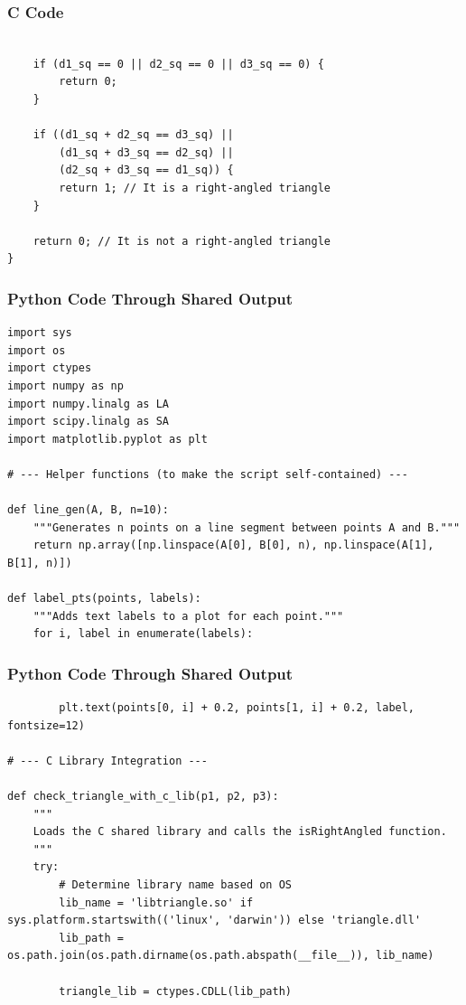 \documentclass{beamer}
\begin{document}
\begin{frame}[fragile]
\frametitle{C Code }
\begin{lstlisting}

    if (d1_sq == 0 || d2_sq == 0 || d3_sq == 0) {
        return 0;
    }

    if ((d1_sq + d2_sq == d3_sq) ||
        (d1_sq + d3_sq == d2_sq) ||
        (d2_sq + d3_sq == d1_sq)) {
        return 1; // It is a right-angled triangle
    }

    return 0; // It is not a right-angled triangle
}

\end{lstlisting}
\end{frame}  

\begin{frame}[fragile]
\frametitle{Python Code Through Shared Output}
\begin{lstlisting}
import sys
import os
import ctypes
import numpy as np
import numpy.linalg as LA
import scipy.linalg as SA
import matplotlib.pyplot as plt

# --- Helper functions (to make the script self-contained) ---

def line_gen(A, B, n=10):
    """Generates n points on a line segment between points A and B."""
    return np.array([np.linspace(A[0], B[0], n), np.linspace(A[1], B[1], n)])

def label_pts(points, labels):
    """Adds text labels to a plot for each point."""
    for i, label in enumerate(labels):
    \end{lstlisting}
\end{frame}  

\begin{frame}[fragile]
\frametitle{Python Code Through Shared Output}
\begin{lstlisting}
        plt.text(points[0, i] + 0.2, points[1, i] + 0.2, label, fontsize=12)

# --- C Library Integration ---

def check_triangle_with_c_lib(p1, p2, p3):
    """
    Loads the C shared library and calls the isRightAngled function.
    """
    try:
        # Determine library name based on OS
        lib_name = 'libtriangle.so' if sys.platform.startswith(('linux', 'darwin')) else 'triangle.dll'
        lib_path = os.path.join(os.path.dirname(os.path.abspath(__file__)), lib_name)
        
        triangle_lib = ctypes.CDLL(lib_path)
        \end{lstlisting}
\end{frame}  
\end{document}

